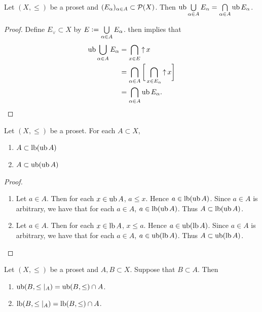 \documentclass{book}
\begin{document}
	\begin{ex} 
		Let $(X, \leq)$ be a proset and $(E_{\alpha})_{\alpha \in A} \subset \mathcal{P}(X)$. Then $\operatorname{ub} \bigcup\limits_{\alpha \in A} E_{\alpha} = \bigcap\limits_{\alpha \in A} \operatorname{ub} E_{\alpha}$.
	\end{ex}
	
	\begin{proof}
		Define $E_\vee \subset X$ by $E \vcentcolon= \bigcup\limits_{\alpha \in A} E_{\alpha}$.  then implies that
		\begin{align*}
			\operatorname{ub} \bigcup\limits_{\alpha \in A} E_{\alpha}
			& = \bigcap\limits_{x \in E} \operatorname{\uparrow} x \\
			& = \bigcap\limits_{\alpha \in A} \bigg[ \bigcap\limits_{x \in E_{\alpha}} \operatorname{\uparrow} x \bigg] \\
			& = \bigcap\limits_{\alpha \in A} \operatorname{ub} E_{\alpha}.
		\end{align*}
	\end{proof}
	
	\begin{ex} 
		Let $(X, \leq)$ be a proset. For each $A \subset X$,
		\begin{enumerate}
			\item $A \subset \operatorname{lb}(\operatorname{ub} A)$
			\item $A \subset \operatorname{ub}(\operatorname{ub} A)$
		\end{enumerate}
	\end{ex}
	
	\begin{proof}\
		\begin{enumerate}
			\item Let $a \in A$. Then for each $x \in \operatorname{ub} A$, $a \leq x$. Hence $a \in \operatorname{lb} (\operatorname{ub} A)$. Since $a \in A$ is arbitrary, we have that for each $a \in A$, $a \in \operatorname{lb} (\operatorname{ub} A)$. Thus $A \subset \operatorname{lb} (\operatorname{ub} A)$.
			\item Let $a \in A$. Then for each $x \in \operatorname{lb} A$, $x \leq a$. Hence $a \in \operatorname{ub} (\operatorname{lb} A)$. Since $a \in A$ is arbitrary, we have that for each $a \in A$, $a \in \operatorname{ub} (\operatorname{lb} A)$. Thus $A \subset \operatorname{ub} (\operatorname{lb} A)$.
		\end{enumerate}
	\end{proof}
	
	\begin{ex} 
		Let $(X, \leq)$ be a proset and $A, B \subset X$. Suppose that $B \subset A$. Then 
		\begin{enumerate}
			\item $\operatorname{ub}(B, \leq|_A) = \operatorname{ub}(B, \leq) \cap A$.
			\item $\operatorname{lb}(B, \leq|_A) = \operatorname{lb}(B, \leq) \cap A$.
		\end{enumerate}
	\end{ex}
	
\end{document}
